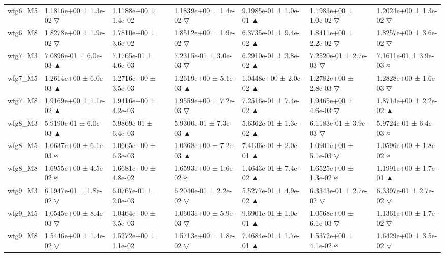 \begin{tabular}{lllllll}
wfg6\_M5 & 1.1816e+00 ± 1.3e-02 ▽ & 1.1188e+00 ± 1.4e-02 & 1.1839e+00 ± 1.4e-02 ▽ & 9.1985e-01 ± 1.0e-01 ▲ & 1.1983e+00 ± 1.0e-02 ▽ & 1.2024e+00 ± 1.3e-02 ▽ \\
wfg6\_M8 & 1.8278e+00 ± 1.9e-02 ▽ & 1.7810e+00 ± 3.6e-02 & 1.8512e+00 ± 1.9e-02 ▽ & 6.3735e-01 ± 9.4e-02 ▲ & 1.8411e+00 ± 2.2e-02 ▽ & 1.8257e+00 ± 3.6e-02 ▽ \\
wfg7\_M3 & 7.0896e-01 ± 6.0e-03 ▲ & 7.1765e-01 ± 4.6e-03 & 7.2315e-01 ± 3.0e-03 ▽ & 6.2910e-01 ± 3.8e-02 ▲ & 7.2520e-01 ± 2.7e-03 ▽ & 7.1611e-01 ± 3.9e-03 ≈ \\
wfg7\_M5 & 1.2614e+00 ± 6.0e-03 ▲ & 1.2716e+00 ± 3.5e-03 & 1.2619e+00 ± 5.1e-03 ▲ & 1.0448e+00 ± 2.0e-02 ▲ & 1.2782e+00 ± 2.8e-03 ▽ & 1.2828e+00 ± 1.6e-03 ▽ \\
wfg7\_M8 & 1.9169e+00 ± 1.1e-02 ▲ & 1.9416e+00 ± 4.2e-03 & 1.9559e+00 ± 7.2e-03 ▽ & 7.2516e-01 ± 7.4e-02 ▲ & 1.9465e+00 ± 4.6e-03 ▽ & 1.8714e+00 ± 2.2e-02 ▲ \\
wfg8\_M3 & 5.9190e-01 ± 6.0e-03 ▲ & 5.9869e-01 ± 6.4e-03 & 5.9300e-01 ± 7.3e-03 ▲ & 5.6362e-01 ± 1.3e-02 ▲ & 6.1183e-01 ± 3.9e-03 ▽ & 5.9724e-01 ± 6.4e-03 ≈ \\
wfg8\_M5 & 1.0637e+00 ± 6.1e-03 ≈ & 1.0665e+00 ± 6.3e-03 & 1.0368e+00 ± 7.2e-03 ▲ & 7.4136e-01 ± 2.0e-01 ▲ & 1.0901e+00 ± 5.1e-03 ▽ & 1.0596e+00 ± 1.8e-02 ≈ \\
wfg8\_M8 & 1.6955e+00 ± 4.5e-02 ≈ & 1.6681e+00 ± 4.8e-02 & 1.6593e+00 ± 1.6e-02 ≈ & 1.4643e-01 ± 7.4e-02 ▲ & 1.6525e+00 ± 1.3e-02 ≈ & 1.1991e+00 ± 1.7e-01 ▲ \\
wfg9\_M3 & 6.1947e-01 ± 1.8e-02 ▽ & 6.0767e-01 ± 2.0e-03 & 6.2040e-01 ± 2.2e-02 ▽ & 5.5277e-01 ± 4.9e-02 ▲ & 6.3343e-01 ± 2.7e-02 ▽ & 6.3397e-01 ± 2.7e-02 ▽ \\
wfg9\_M5 & 1.0545e+00 ± 8.4e-03 ▽ & 1.0464e+00 ± 3.5e-03 & 1.0603e+00 ± 5.9e-03 ▽ & 9.6901e-01 ± 1.0e-01 ▲ & 1.0568e+00 ± 6.1e-03 ▽ & 1.1361e+00 ± 1.7e-02 ▽ \\
wfg9\_M8 & 1.5446e+00 ± 1.4e-02 ▽ & 1.5272e+00 ± 1.1e-02 & 1.5713e+00 ± 1.8e-02 ▽ & 7.4684e-01 ± 1.7e-01 ▲ & 1.5372e+00 ± 4.1e-02 ≈ & 1.6429e+00 ± 3.5e-02 ▽ \\
\bottomrule
\end{tabular}
